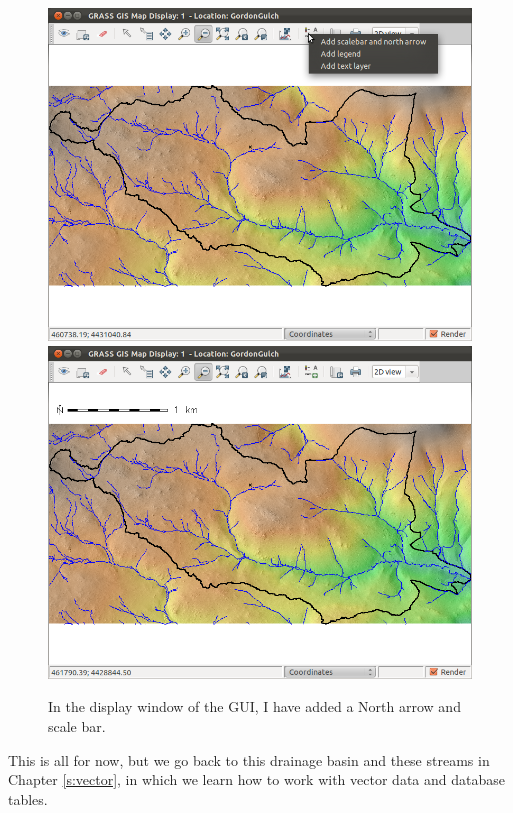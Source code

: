 \documentclass{book}
\begin{document}
\begin{figure}[!htb]
 \begin{center}
 \includegraphics[width=.9\linewidth]{figures/ubuntu/addMapElements.png}
 \includegraphics[width=.9\linewidth]{figures/ubuntu/hydroMapScale.png}
 \caption{In the display window of the GUI, I have added a North arrow and scale bar.}
 \label{fig:hydroMap}
 \end{center}
\end{figure}

This is all for now, but we go back to this drainage basin and these streams in Chapter \ref{s:vector}, in which we learn how to work with vector data and database tables.

\afterpage{\clearpage}

\clearpage
\end{document}
